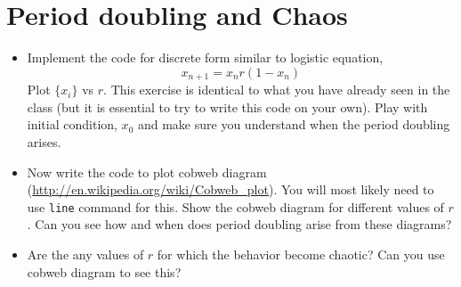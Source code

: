 \documentclass[letterpaper]{article}
\begin{document}
\section{Period doubling and Chaos}
\begin{itemize}
\item Implement the code for discrete form similar to logistic equation,
\begin{equation*}
x_{n+1}=x_n r(1-x_n)
\end{equation*}
Plot $\{x_i\}$ vs $r$. This exercise is identical to what you have already seen in the class (but it is essential to try to write this code on your own). Play with initial condition, $x_0$ and make sure you understand when the period doubling arises. 
\item Now write the code to plot cobweb diagram (\url{http://en.wikipedia.org/wiki/Cobweb_plot}). You will most likely need to use \verb|line| command for this. Show the cobweb diagram for different values of $r$. Can you see how and when does period doubling arise from these diagrams? 
\item Are the any values of $r$ for which the behavior become chaotic? Can you use cobweb diagram to see this? 
\end{itemize}
\end{document}

